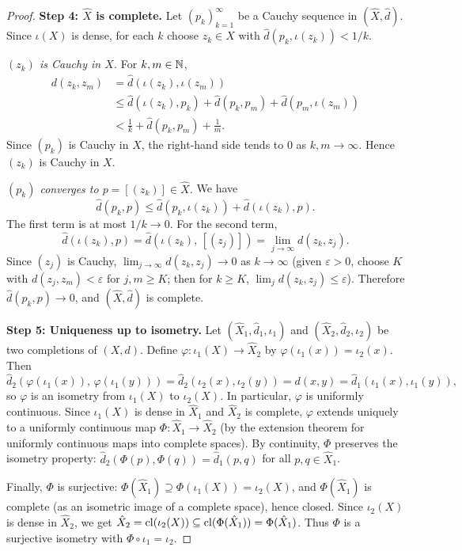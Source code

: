 \documentclass[11pt,a4paper]{article}
\begin{document}
\begin{proof}
\textbf{Step 4: $\hat{X}$ is complete.}
Let $(p_k)_{k=1}^\infty$ be a Cauchy sequence in $(\hat{X}, \hat{d})$. Since
$\iota(X)$ is dense, for each $k$ choose $z_k \in X$ with
$\hat{d}(p_k, \iota(z_k)) < 1/k$.

\emph{$(z_k)$ is Cauchy in $X$.} For $k, m \in \mathbb{N}$,
\begin{align*}
d(z_k, z_m) &= \hat{d}(\iota(z_k), \iota(z_m)) \\
  &\le \hat{d}(\iota(z_k), p_k) + \hat{d}(p_k, p_m) +
       \hat{d}(p_m, \iota(z_m)) \\
  &< \frac{1}{k} + \hat{d}(p_k, p_m) + \frac{1}{m}.
\end{align*}
Since $(p_k)$ is Cauchy in $\hat{X}$, the right-hand side tends to $0$ as
$k, m \to \infty$. Hence $(z_k)$ is Cauchy in $X$.

\emph{$(p_k)$ converges to $p = [(z_k)] \in \hat{X}$.} We have
\[
\hat{d}(p_k, p) \le \hat{d}(p_k, \iota(z_k)) + \hat{d}(\iota(z_k), p).
\]
The first term is at most $1/k \to 0$. For the second term,
\[
\hat{d}(\iota(z_k), p) = \hat{d}(\iota(z_k),\, [(z_j)]) =
\lim_{j \to \infty} d(z_k, z_j).
\]
Since $(z_j)$ is Cauchy, $\lim_{j \to \infty} d(z_k, z_j) \to 0$ as
$k \to \infty$ (given $\varepsilon > 0$, choose $K$ with
$d(z_j, z_m) < \varepsilon$ for $j, m \ge K$; then for $k \ge K$,
$\lim_{j} d(z_k, z_j) \le \varepsilon$). Therefore
$\hat{d}(p_k, p) \to 0$, and $(\hat{X}, \hat{d})$ is complete.

\textbf{Step 5: Uniqueness up to isometry.}
Let $(\hat{X}_1, \hat{d}_1, \iota_1)$ and $(\hat{X}_2, \hat{d}_2, \iota_2)$
be two completions of $(X,d)$. Define
$\varphi \colon \iota_1(X) \to \hat{X}_2$ by
$\varphi(\iota_1(x)) = \iota_2(x)$. Then
\[
\hat{d}_2(\varphi(\iota_1(x)),\, \varphi(\iota_1(y))) =
\hat{d}_2(\iota_2(x), \iota_2(y)) = d(x,y) =
\hat{d}_1(\iota_1(x), \iota_1(y)),
\]
so $\varphi$ is an isometry from $\iota_1(X)$ to $\iota_2(X)$. In particular,
$\varphi$ is uniformly continuous. Since $\iota_1(X)$ is dense in $\hat{X}_1$
and $\hat{X}_2$ is complete, $\varphi$ extends uniquely to a uniformly
continuous map $\Phi \colon \hat{X}_1 \to \hat{X}_2$ (by the extension theorem
for uniformly continuous maps into complete spaces). By continuity, $\Phi$
preserves the isometry property:
$\hat{d}_2(\Phi(p), \Phi(q)) = \hat{d}_1(p, q)$ for all
$p, q \in \hat{X}_1$.

Finally, $\Phi$ is surjective: $\Phi(\hat{X}_1) \supseteq
\Phi(\iota_1(X)) = \iota_2(X)$, and $\Phi(\hat{X}_1)$ is complete (as an
isometric image of a complete space), hence closed. Since $\iota_2(X)$ is
dense in $\hat{X}_2$, we get
$\hat{X}_2 = \operatorname{cl}(\iota_2(X)) \subseteq \operatorname{cl}(\Phi(\hat{X}_1)) =
\Phi(\hat{X}_1)$. Thus $\Phi$ is a surjective isometry with
$\Phi \circ \iota_1 = \iota_2$.
\end{proof}
\end{document}
